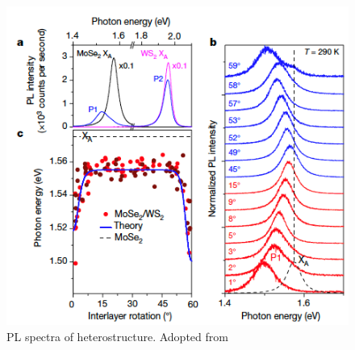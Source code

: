 \begin{figure}[h]
	\begin{center}
		\includegraphics[scale=1]{Heterostructures/HeterostructurePLSpectrumInterlayerTwist.png}
		\caption{PL spectra of heterostructure. Adopted from \cite{Alexeev2019}}
		\label{fig:HeterostructurePLSpectrumInterlayerTwist}
	\end{center}
\end{figure}